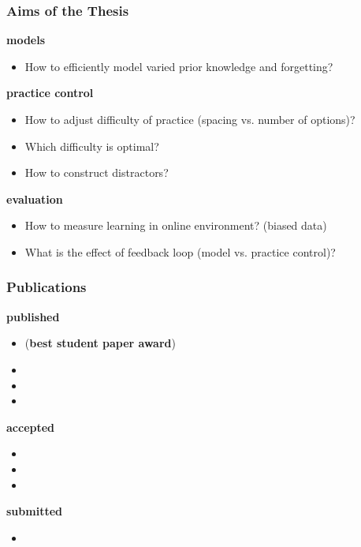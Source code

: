 \documentclass[xcolor=svgnames]{beamer}
\begin{document}
\begin{frame}
	\frametitle{Aims of the Thesis}
		\small
		\textbf{models}
		\begin{itemize}
			\item How to efficiently model varied prior knowledge and forgetting?
		\end{itemize}
		\textbf{practice control}
		\begin{itemize}
			\item How to adjust difficulty of practice (spacing vs. number of options)?
			\item Which difficulty is optimal?
			\item How to construct distractors?
		\end{itemize}
		\textbf{evaluation}
		\begin{itemize}
			\item How to measure learning in online environment? (biased data)
			\item What is the effect of feedback loop (model vs. practice control)?
		\end{itemize}
\end{frame}
\begin{frame}
	\frametitle{Publications}
	\tiny
	{\small \textbf{published}}
	\begin{itemize}
		\item {} (\textbf{best student paper award})
		\item {}
		\item {}
		\item {}
	\end{itemize}
	{\small \textbf{accepted}}
	\begin{itemize}
		\item {}
		\item {}
		\item {}
	\end{itemize}
	{\small \textbf{submitted}}
	\begin{itemize}
		\item {}
	\end{itemize}
\end{frame}
\end{document}

